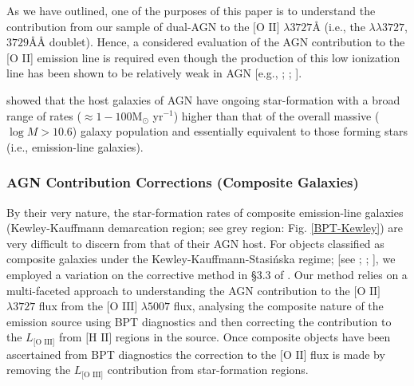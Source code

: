 As we have outlined, one of the purposes of this paper is to understand the contribution from our sample of dual-AGN to the $\text{[O II]}$ $\lambda{3727}Å$ (i.e., the $\lambda\lambda{3727}$,$3729ÅÅ$ doublet). Hence, a considered evaluation of the AGN contribution to the [O II] emission line is required even though the production of this low ionization line has been shown to be relatively weak in AGN [e.g., \cite{Ferland_1986}; \cite{Ho_1993}; \cite{2006ApJ...642..702K}]. 

\cite{2009ApJ...696..396S} showed that the host galaxies of AGN have ongoing star-formation with a broad range of rates ($\approx{1-100}$M$_{\odot}$ yr$^{-1}$) higher than that of the overall massive ($\log{M}>{10.6}$) galaxy population and essentially equivalent to those forming stars (i.e., emission-line galaxies).

\subsubsection{AGN Contribution Corrections (Composite Galaxies)}

By their very nature, the star-formation rates of composite emission-line galaxies (Kewley-Kauffmann demarcation region; see grey region: Fig. \ref{BPT-Kewley}) are very difficult to discern from that of their AGN host. For objects classified as composite galaxies under the Kewley-Kauffmann-Stasi{\'n}ska regime; [see \cite{Kewley_Dopita_Sutherland_Heisler_Trevena_2001}; \cite{Kauffmann_2003}; \cite{Stasinska_2006}], we employed a variation on the corrective method in §3.3 of \cite{Wild_2010}. Our method relies on a multi-faceted approach to understanding the AGN contribution to the $\text{[O II]}$ $\lambda3727$ flux from the $\text{[O III]}$ $\lambda5007$ flux, analysing the composite nature of the emission source using BPT diagnostics and then correcting the contribution to the $L_{\text{[O III]}}$ from $\text{[H II]}$ regions in the source. Once composite objects have been ascertained from BPT diagnostics the correction to the $\text{[O II]}$ flux is made by removing the $L_{\text{[O III]}}$ contribution from star-formation regions.